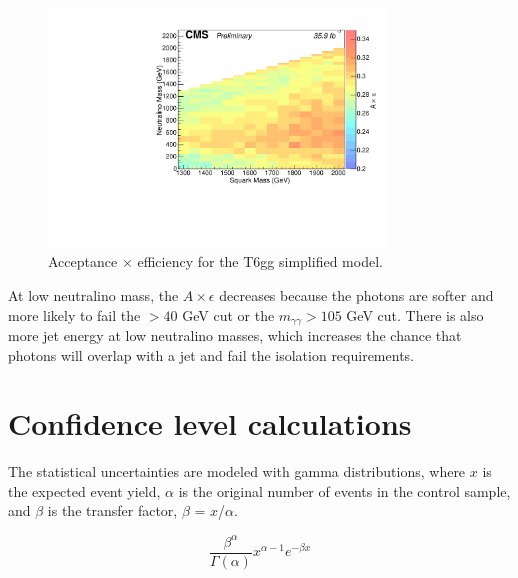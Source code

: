 \begin{figure}[h]
\begin{center}
\includegraphics[width=0.8\textwidth]{Figures/Results/accXeff_T6gg.pdf}
\end{center}
    \caption{Acceptance $\times$ efficiency for the T6gg simplified model.}
    \label{fig:accXeff_T6gg}
\end{figure}


At low neutralino mass, the $A \times \epsilon$ decreases because the photons are softer and more likely to fail the \pT $> 40$ GeV cut or the 
$m_{\gamma\gamma} > 105$ GeV cut.
There is also more jet energy at low neutralino masses, which increases the chance that photons will overlap with a jet and fail the 
isolation requirements.


\section{Confidence level calculations}
\label{sec:cls}

The statistical uncertainties are modeled with gamma distributions, where $x$ is the expected event yield, 
$\alpha$ is the original number of events in the control sample, 
and $\beta$ is the transfer factor, $\beta$ = $x$/$\alpha$. 

\begin{equation}
	\dfrac{\beta^\alpha}{\Gamma(\alpha)} x^{\alpha-1}e^{-\beta x}
\end{equation}

